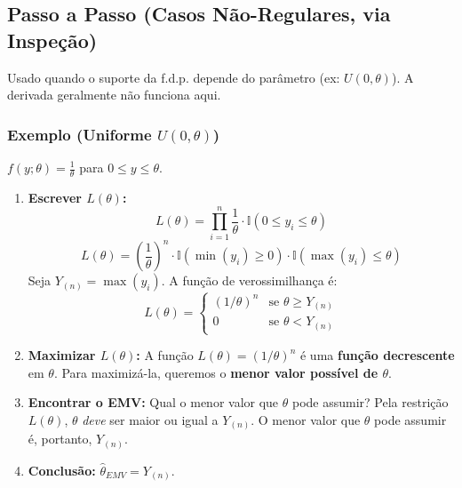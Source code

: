 \subsection{Passo a Passo (Casos Não-Regulares, via Inspeção)}
Usado quando o suporte da f.d.p. depende do parâmetro (ex: $U(0, \theta)$). A derivada geralmente não funciona aqui.

\subsubsection{Exemplo (Uniforme $U(0, \theta)$)}
$f(y; \theta) = \frac{1}{\theta}$ para $0 \le y \le \theta$.
\begin{enumerate}
    \item \textbf{Escrever $L(\theta)$:}
    $$ L(\theta) = \prod_{i=1}^n \frac{1}{\theta} \cdot \mathbb{I}(0 \le y_i \le \theta) $$
    $$ L(\theta) = \left(\frac{1}{\theta}\right)^n \cdot \mathbb{I}(\min(y_i) \ge 0) \cdot \mathbb{I}(\max(y_i) \le \theta) $$
    Seja $Y_{(n)} = \max(y_i)$. A função de verossimilhança é:
    $$ L(\theta) = \begin{cases} (1/\theta)^n & \text{se } \theta \ge Y_{(n)} \\ 0 & \text{se } \theta < Y_{(n)} \end{cases} $$
    \item \textbf{Maximizar $L(\theta)$:}
    A função $L(\theta) = (1/\theta)^n$ é uma \textbf{função decrescente} em $\theta$. Para maximizá-la, queremos o \textbf{menor valor possível de $\theta$}.
    \item \textbf{Encontrar o EMV:} Qual o menor valor que $\theta$ pode assumir? Pela restrição $L(\theta)$, $\theta$ \textit{deve} ser maior ou igual a $Y_{(n)}$. O menor valor que $\theta$ pode assumir é, portanto, $Y_{(n)}$.
    \item \textbf{Conclusão:} $\hat{\theta}_{EMV} = Y_{(n)}$.
\end{enumerate}

